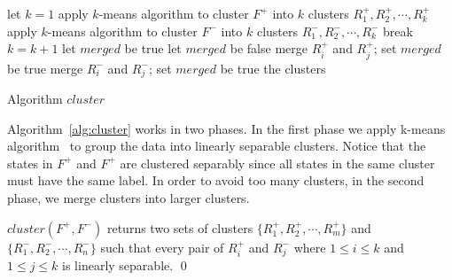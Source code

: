 
\begin{algorithm}[t]
\SetAlgoVlined
{}
let $k = 1$\;
 {
     apply $k$-means algorithm to cluster $F^+$ into $k$ clusters $R^+_1, R^+_2, \cdots, R^+_k$\;
     apply $k$-means algorithm to cluster $F^-$ into $k$ clusters $R^-_1, R^-_2, \cdots, R^-_k$\;
      {
        break\;
     }
     $k = k+1$\;
}
let $merged$ be true\;
 {
    let $merged$ be false\;
     {
         {
            merge $R^+_i$ and $R^+_j$; set $merged$ be true\;
        }
    }
     {
         {
            merge $R^-_i$ and $R^-_j$; set $merged$ be true\;
        }
    }
}
\Return the clusters\;
\caption{Algorithm $cluster$}
\label{alg:cluster}
\end{algorithm}

Algorithm~\ref{alg:cluster} works in two phases. In the first phase we apply k-means algorithm~\cite{} to group the data into linearly separable clusters. Notice that the states in $F^+$ and $F^+$ are clustered separably since all states in the same cluster must have the same label. In order to avoid too many clusters, in the second phase, we merge clusters into larger clusters.

\begin{example}

\end{example}

\begin{proposition}
$cluster(F^+, F^-)$ returns two sets of clusters $\{R^+_1, R^+_2, \cdots, R^+_m\}$ and $\{R^-_1, R^-_2, \cdots, R^-_n\}$ such that every pair of $R^+_i$ and $R^-_j$ where $1 \leq i \leq k$ and $1 \leq j \leq k$ is linearly separable. \hfill \qed
\end{proposition}

